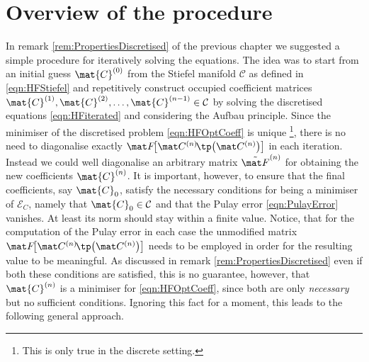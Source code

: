 \section{Overview of the \SCF procedure}
\label{sec:OverviewSCF}
In remark \ref{rem:PropertiesDiscretised}
of the previous chapter
we suggested a simple procedure for iteratively solving the \HF equations.
The idea was to start from an initial guess $\mat{C}^{(0)}$
from the Stiefel manifold $\mathcal{C}$ as defined in \eqref{eqn:HFStiefel}
and repetitively construct occupied coefficient
matrices $\mat{C}^{(1)}, \mat{C}^{(2)}, \ldots, \mat{C}^{(n-1)} \in \mathcal{C}$
by solving the discretised \HF equations \eqref{eqn:HFiterated}
and considering the Aufbau principle.
Since the minimiser
of the discretised \HF problem \eqref{eqn:HFOptCoeff}
is unique%
\footnote{This is only true in the discrete setting.},
there is no need to diagonalise exactly $\matFnfull$ in each iteration.
Instead we could well diagonalise an arbitrary matrix $\matFnt$
for obtaining the new coefficients $\mat{C}^{(n)}$.
It is important, however, to ensure that the final coefficients,
say $\mat{C}_0$,
satisfy the necessary conditions for being a minimiser of $\mathcal{E}_C$,
namely that $\mat{C}_0 \in \mathcal{C}$ and that the Pulay error \eqref{eqn:PulayError} vanishes.
At least its norm should stay within a finite value.
Notice, that for the computation of the Pulay error
in each case the unmodified matrix $\matFnfull$ needs to be employed
in order for the resulting value to be meaningful.
As discussed in remark \vref{rem:PropertiesDiscretised}
even if both these conditions are satisfied,
this is no guarantee, however,
that $\mat{C}^{(n)}$ is a minimiser for \eqref{eqn:HFOptCoeff},
since both are only \emph{necessary} but no sufficient conditions.
Ignoring this fact for a moment, this leads to the following general approach.

